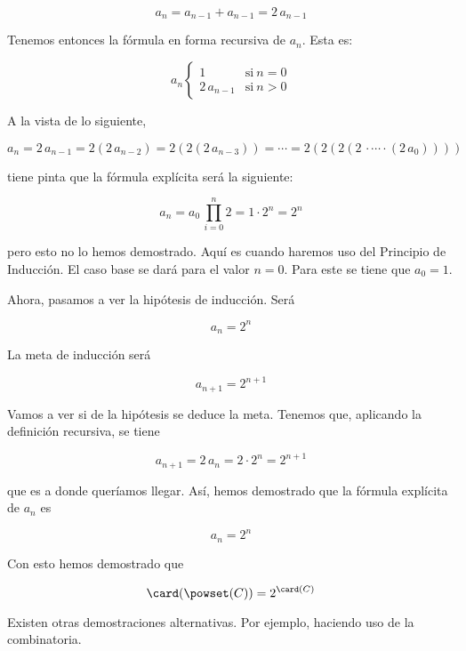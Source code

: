 \begin{example}
  \[ a_n = a_{n-1} + a_{n-1} = 2 \, a_{n-1} \]

  Tenemos entonces la fórmula en forma recursiva de $a_n$. Esta es:

  \begin{equation*}
    a_n
    \begin{cases}
      1             & \text{si} \ n = 0 \\
      2 \, a_{n-1}  & \text{si} \ n > 0
    \end{cases}
  \end{equation*}

  A la vista de lo siguiente,

  \[ a_n = 2\, a_{n-1} = 2 (2\, a_{n-2}) = 2 (2 (2\, a_{n-3})) = \cdots = 2
  (2 (2 (2\, \cdot \cdots \cdot (2\, a_0)))) \]

  \noindent tiene pinta que la fórmula explícita será la siguiente:

  \[ a_n = a_0 \, \prod_{i=0}^n 2 = 1 \cdot 2^n = 2^n \]

  \noindent pero esto no lo hemos demostrado. Aquí es cuando haremos uso del
  Principio de Inducción. El caso base se dará para el valor $n = 0$. Para
  este se tiene que $a_0 = 1$.

  Ahora, pasamos a ver la hipótesis de inducción. Será

  \[ a_n = 2^n \]

  La meta de inducción será

  \[ a_{n+1} = 2^{n+1} \]

  Vamos a ver si de la hipótesis se deduce la meta. Tenemos que, aplicando
  la definición recursiva, se tiene

  \[ a_{n+1} = 2 \, a_n = 2 \cdot 2^n = 2^{n+1} \]

  \noindent que es a donde queríamos llegar. Así, hemos demostrado que la
  fórmula explícita de $a_n$ es

  \[ a_n = 2^n \]

  Con esto hemos demostrado que

  \[ \card(\powset(C)) = 2^{\card(C)} \]

  Existen otras demostraciones alternativas. Por ejemplo, haciendo uso de la
  combinatoria.
\end{example}




